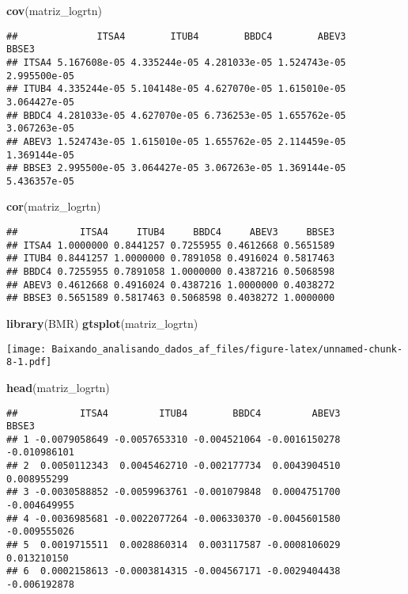 \documentclass[]{article}
\newenvironment{Shaded}{\begin{snugshade}}{\end{snugshade}}
\newcommand{\KeywordTok}[1]{\textcolor[rgb]{0.13,0.29,0.53}{\textbf{{#1}}}}
\newcommand{\NormalTok}[1]{{#1}}
\begin{document}
\begin{Shaded}
\begin{Highlighting}[]
\KeywordTok{cov}\NormalTok{(matriz_logrtn)}
\end{Highlighting}
\end{Shaded}

\begin{verbatim}
##              ITSA4        ITUB4        BBDC4        ABEV3        BBSE3
## ITSA4 5.167608e-05 4.335244e-05 4.281033e-05 1.524743e-05 2.995500e-05
## ITUB4 4.335244e-05 5.104148e-05 4.627070e-05 1.615010e-05 3.064427e-05
## BBDC4 4.281033e-05 4.627070e-05 6.736253e-05 1.655762e-05 3.067263e-05
## ABEV3 1.524743e-05 1.615010e-05 1.655762e-05 2.114459e-05 1.369144e-05
## BBSE3 2.995500e-05 3.064427e-05 3.067263e-05 1.369144e-05 5.436357e-05
\end{verbatim}

\begin{Shaded}
\begin{Highlighting}[]
\KeywordTok{cor}\NormalTok{(matriz_logrtn)}
\end{Highlighting}
\end{Shaded}

\begin{verbatim}
##           ITSA4     ITUB4     BBDC4     ABEV3     BBSE3
## ITSA4 1.0000000 0.8441257 0.7255955 0.4612668 0.5651589
## ITUB4 0.8441257 1.0000000 0.7891058 0.4916024 0.5817463
## BBDC4 0.7255955 0.7891058 1.0000000 0.4387216 0.5068598
## ABEV3 0.4612668 0.4916024 0.4387216 1.0000000 0.4038272
## BBSE3 0.5651589 0.5817463 0.5068598 0.4038272 1.0000000
\end{verbatim}

\begin{Shaded}
\begin{Highlighting}[]
\KeywordTok{library}\NormalTok{(BMR)}
\KeywordTok{gtsplot}\NormalTok{(matriz_logrtn)}
\end{Highlighting}
\end{Shaded}

\texttt{[image: Baixando\_analisando\_dados\_af\_files/figure-latex/unnamed-chunk-8-1.pdf]}

\begin{Shaded}
\begin{Highlighting}[]
\KeywordTok{head}\NormalTok{(matriz_logrtn)}
\end{Highlighting}
\end{Shaded}

\begin{verbatim}
##           ITSA4         ITUB4        BBDC4         ABEV3        BBSE3
## 1 -0.0079058649 -0.0057653310 -0.004521064 -0.0016150278 -0.010986101
## 2  0.0050112343  0.0045462710 -0.002177734  0.0043904510  0.008955299
## 3 -0.0030588852 -0.0059963761 -0.001079848  0.0004751700 -0.004649955
## 4 -0.0036985681 -0.0022077264 -0.006330370 -0.0045601580 -0.009555026
## 5  0.0019715511  0.0028860314  0.003117587 -0.0008106029  0.013210150
## 6  0.0002158613 -0.0003814315 -0.004567171 -0.0029404438 -0.006192878
\end{verbatim}
\end{document}
